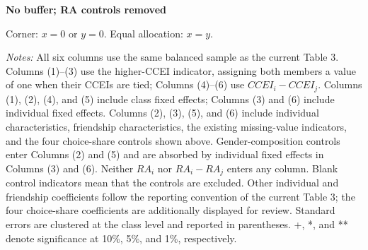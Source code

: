 \documentclass[11pt]{article}
\begin{document}
\clearpage\begin{center}{\large\bfseries No buffer; RA controls removed}\end{center}
Corner: $x=0$ or $y=0$. Equal allocation: $x=y$.
\begin{center}
\end{center}
{\footnotesize\textit{Notes:} All six columns use the same balanced sample as the current Table 3. Columns (1)--(3) use the higher-CCEI indicator, assigning both members a value of one when their CCEIs are tied; Columns (4)--(6) use $CCEI_i-CCEI_j$. Columns (1), (2), (4), and (5) include class fixed effects; Columns (3) and (6) include individual fixed effects. Columns (2), (3), (5), and (6) include individual characteristics, friendship characteristics, the existing missing-value indicators, and the four choice-share controls shown above. Gender-composition controls enter Columns (2) and (5) and are absorbed by individual fixed effects in Columns (3) and (6). Neither $RA_i$ nor $RA_i-RA_j$ enters any column. Blank control indicators mean that the controls are excluded. Other individual and friendship coefficients follow the reporting convention of the current Table 3; the four choice-share coefficients are additionally displayed for review. Standard errors are clustered at the class level and reported in parentheses. +, *, and ** denote significance at 10\%, 5\%, and 1\%, respectively.}
\end{document}
